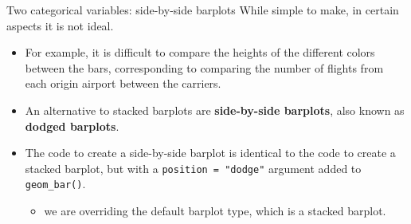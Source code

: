 \documentclass[
  ignorenonframetext,
]{beamer}
\providecommand{\tightlist}{%
  \setlength{\itemsep}{0pt}\setlength{\parskip}{0pt}}
\begin{document}
\begin{frame}[fragile]{Two categorical variables: side-by-side barplots}
\protect\hypertarget{two-categorical-variables-side-by-side-barplots}{}
While simple to make, in certain aspects it is not ideal.

\begin{itemize}
\item
  For example, it is difficult to compare the heights of the different
  colors between the bars, corresponding to comparing the number of
  flights from each origin airport between the carriers.
\item
  An alternative to stacked barplots are \textbf{side-by-side barplots},
  also known as \textbf{dodged barplots}.
\item
  The code to create a side-by-side barplot is identical to the code to
  create a stacked barplot, but with a \texttt{position\ =\ "dodge"}
  argument added to \texttt{geom\_bar()}.

  \begin{itemize}
  \tightlist
  \item
    we are overriding the default barplot type, which is a stacked
    barplot.
  \end{itemize}
\end{itemize}
\end{frame}
\end{document}

